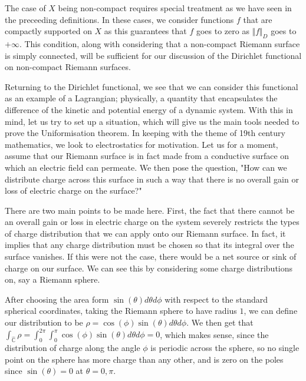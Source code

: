 \documentclass[11pt]{report}
\theoremstyle{definition}
\begin{document}
The case of $X$ being non-compact requires special treatment as we have seen in the preceeding definitions. In these cases, we consider functions $f$ that are compactly supported on $X$ as this guarantees that $f$ goes to zero as $\Vert f\Vert _D$ goes to $+\infty$. This condition, along with considering that a non-compact Riemann surface is simply connected, will be sufficient for our discussion of the Dirichlet functional on non-compact Riemann surfaces.

Returning to the Dirichlet functional, we see that we can consider this functional as an example of a Lagrangian; physically, a quantity that encapsulates the difference of the kinetic and potential energy of a dynamic system. With this in mind, let us try to set up a situation, which will give us the main tools needed to prove the Uniformisation theorem. In keeping with the theme of 19th century mathematics, we look to electrostatics for motivation. Let us for a moment, assume that our Riemann surface is in fact made from a conductive surface on which an electric field can permeate. We then pose the question, "How can we distribute charge across this surface in such a way that there is no overall gain or loss of electric charge on the surface?" 

There are two main points to be made here. First, the fact that there cannot be an overall gain or loss in electric charge on the system severely restricts the types of charge distribution that we can apply onto our Riemann surface. In fact, it implies that any charge distribution must be chosen so that its integral over the surface vanishes. If this were not the case, there would be a net source or sink of charge on our surface. We can see this by considering some charge distributions on, say a Riemann sphere. 

After choosing the area form $\sin(\theta)d\theta d\phi$ with respect to the standard spherical coordinates, taking the Riemann sphere to have radius $1$, we can define our distribution to be $\rho = \cos(\phi)\sin(\theta)d\theta d\phi$. We then get that $\int_{\hat{\mathbb{C}}}\rho =\int_0^{2\pi}\int_0^{\pi}\cos(\phi)\sin(\theta)d\theta d\phi= 0$, which makes sense, since the distribution of charge along the angle $\phi$ is periodic across the sphere, so no single point on the sphere has more charge than any other, and is zero on the poles since $\sin(\theta)=0$ at $\theta = 0,\pi$.
\end{document}

